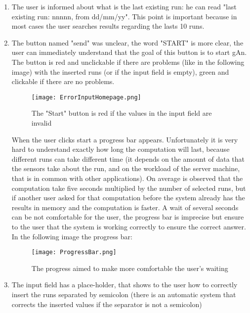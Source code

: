 \begin{enumerate}

\item The user is informed about what is the last existing run: he can read "last existing run: nnnnn, from dd/mm/yy". This point is important because in most cases the user searches results regarding the lasts 10 runs.

\item The button named "send" was unclear, the word "START" is more clear, the user can immediately understand that the goal of this button is to start gAn. The button is red and unclickable if there are problems (like in the following image) with the inserted runs (or if the input field is empty), green and clickable if there are no problems.	

\begin{figure}[H]
\centering
\texttt{[image: ErrorInputHomepage.png]}  
\caption{The "Start" button is red if the values in the input field are invalid}
\end{figure}

When the user clicks start a progress bar appears. Unfortunately it is very hard to understand exactly how long the computation will last, because different runs can take different time (it depends on the amount of data that the sensors take about the run, and on the workload of the server machine, that is in common with other applications). On average is observed that the computation take five seconds multiplied by the number of selected runs, but if another user asked for that computation before the system already has the results in memory and the computation is faster. A wait of several seconds can be not comfortable for the user, the progress bar is imprecise but ensure to the user that the system is working correctly to ensure the correct answer. In the following image the progress bar:

\begin{figure}[H]
\centering
\texttt{[image: ProgressBar.png]}  
\caption{The progress aimed to make more comfortable the user's waiting}
\end{figure}



\item The input field has a place-holder, that shows to the user how to correctly insert the runs separated by semicolon (there is an automatic system that corrects the inserted values if the separator is not a semicolon)
 

\end{enumerate}
